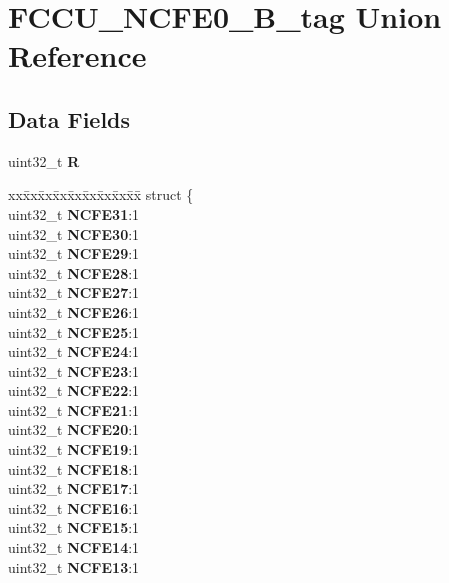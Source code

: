 \hypertarget{unionFCCU__NCFE0__32B__tag}{}\section{F\+C\+C\+U\+\_\+\+N\+C\+F\+E0\+\_\+B\+\_\+tag Union Reference}
\label{unionFCCU__NCFE0__32B__tag}
\subsection*{Data Fields}
\begin{DoxyCompactItemize}
\item 
\mbox{\label{unionFCCU__NCFE0__32B__tag_ae80dc47d64298c962ad53d7a0000fd31}} 
uint32\+\_\+t {\bfseries R}
\item 
\mbox{\label{unionFCCU__NCFE0__32B__tag_ac619bd2f8806b0f5ddfa754be0397132}} 
\begin{tabbing}
xx\=xx\=xx\=xx\=xx\=xx\=xx\=xx\=xx\=\kill
struct \{\\
\>uint32\_t {\bfseries NCFE31}:1\\
\>uint32\_t {\bfseries NCFE30}:1\\
\>uint32\_t {\bfseries NCFE29}:1\\
\>uint32\_t {\bfseries NCFE28}:1\\
\>uint32\_t {\bfseries NCFE27}:1\\
\>uint32\_t {\bfseries NCFE26}:1\\
\>uint32\_t {\bfseries NCFE25}:1\\
\>uint32\_t {\bfseries NCFE24}:1\\
\>uint32\_t {\bfseries NCFE23}:1\\
\>uint32\_t {\bfseries NCFE22}:1\\
\>uint32\_t {\bfseries NCFE21}:1\\
\>uint32\_t {\bfseries NCFE20}:1\\
\>uint32\_t {\bfseries NCFE19}:1\\
\>uint32\_t {\bfseries NCFE18}:1\\
\>uint32\_t {\bfseries NCFE17}:1\\
\>uint32\_t {\bfseries NCFE16}:1\\
\>uint32\_t {\bfseries NCFE15}:1\\
\>uint32\_t {\bfseries NCFE14}:1\\
\>uint32\_t {\bfseries NCFE13}:1\\

\end{tabbing}
\end{DoxyCompactItemize}
